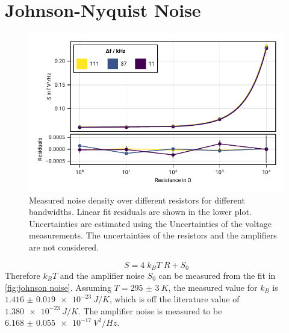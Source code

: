 \documentclass[
    parskip=half, 
    twoside=false,
    twocolumn=true,
    fontsize=11pt,
]{scrarticle}
\begin{document}
\section{Johnson-Nyquist Noise}
\begin{figure}[h!]
    \centering
    \includegraphics{figures/01 johnson noise.pdf}
    \caption{
        Measured noise density over different resistors for different bandwidths.
        Linear fit residuals are shown in the lower plot.
        Uncertainties are estimated using the Uncertainties of the voltage measurements.
        The uncertainties of the resistors and the amplifiers are not considered.
    }
    \label{fig:johnson noise}
\end{figure}

\begin{equation}
    S = 4\; k_B T\; R + S_0
\end{equation} 
Therefore $k_B T$ and the amplifier noise $S_0$ can be measured from the fit in \autoref{fig:johnson noise}.
Assuming $T=\SI{295(3)}{K}$, the measured value for $k_B$ is $\SI{1.416(19)e-23}{J/K}$, which is off the literature value of $\SI{1.380e-23}{J/K}$.
The amplifier noise is measured to be $\SI{6.168(55)e-17}{V^2/Hz}$.
\end{document}
